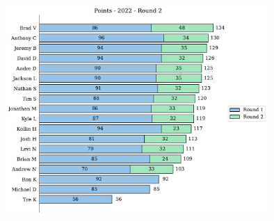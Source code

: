 \documentclass[10pt]{article}
\begin{document}
%
\begin{minipage}[t]{13cm}
    \vspace{0pt}
    \begin{figure}[H]
        \vspace{-1cm}
        \includegraphics[width=12cm,height=8cm,keepaspectratio]{../../figures/2022/Points-2022-Round2.pdf}
    \end{figure}
\end{minipage}
\end{document}
